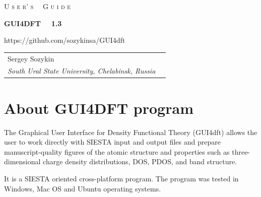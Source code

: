 \documentclass{article}
\begin{document}
\begin{titlepage}
	
	\begin{center}
		
		\vspace{1cm}

		{\Huge \textsc{U s e r' s \, \, G u i d e}}
		
		
		\vspace{1cm}
		\hrulefill
		\vspace{1cm}
		
		{\Huge \textbf{GUI4DFT \, \, 1.3}}
		
		\vspace{1cm}
		\hrulefill
		\vspace{0.5cm}
		
		
		\vspace{1.5cm}
		{\Large https://github.com/sozykinsa/GUI4dft}
		
		\vspace{2.5cm}
		\vspace{1.0cm}
		
		\begin{tabular}{ll}
			
			Sergey Sozykin  \\  %
			\textit{South Ural State University, Chelabinsk, Russia} \\
			
						
		\end{tabular}
		
	\end{center}
	
\end{titlepage}

	
	
\section{About GUI4DFT program}

The Graphical User Interface for Density Functional Theory (GUI4dft) allows the user to work directly with SIESTA input and output files and prepare manuscript-quality figures of the atomic structure and properties such as three-dimensional charge density distributions, DOS, PDOS, and band structure.

It is a SIESTA oriented cross-platform program. The program was tested in Windows, Mac OS and Ubuntu operating systems.
\end{document}
